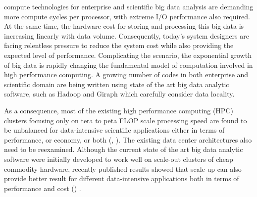 \documentclass[journal]{IEEEtran}
\begin{document}
 

 compute technologies for enterprise and scientific big data analysis are demanding more compute cycles per processor, with extreme I/O performance also required.  At the same time, the hardware cost for storing and processing this big data is increasing linearly with data volume. Consequently, today's system designers are facing relentless pressure to reduce the system cost while also providing the expected level of performance. Complicating the scenario, the exponential growth of big data is rapidly changing the fundamental model of computation involved in high performance computing. A growing number of codes in both enterprise and scientific domain are being written using state of the art big data analytic software, such as Hadoop and Giraph which carefully consider data locality. 


As a consequence, most of the existing high performance  computing (HPC) clusters focusing only on tera to peta FLOP scale processing speed are found to be unbalanced for data-intensive scientific applications either in terms of performance, or economy, or both (\cite{Amdahl:Workloadchang}, \cite{cluster:AmdahlBalancedBlade}). The existing data center architectures also need to be reexamined. Although the current state of the art big data analytic software were initially developed to work well on scale-out clusters of cheap commodity hardware, recently published results showed that scale-up can also provide better result for different data-intensive applications both in terms of performance and cost (\cite{scaleupscaleout:appuswamy}) . 
\end{document}
